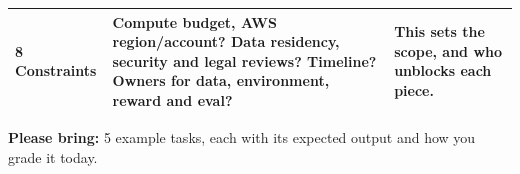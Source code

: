 \begin{frame}
\begin{tabularx}{\textwidth}{@{}>{\raggedright\arraybackslash}p{24mm}>{\raggedright\arraybackslash}X>{\raggedright\arraybackslash}p{44mm}@{}}
\textbf{8\; Constraints} & Compute budget, AWS region/account? Data residency, security and legal reviews? Timeline? Owners for data, environment, reward and eval? & This sets the scope, and who unblocks each piece.\\
\bottomrule
\end{tabularx}
\vspace{1.5mm}
\colorbox{awsblue!35!panel}{\parbox{\dimexpr\textwidth-2\fboxsep-1pt}{\fontsize{7}{8.4}\selectfont\color{white}%
\textbf{Please bring:} 5 example tasks, each with its expected output and how you grade it today.}}
\end{frame}

